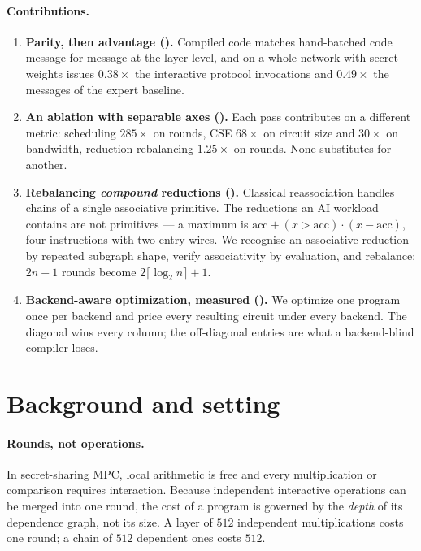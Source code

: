 \documentclass[11pt]{article}
\begin{document}
\paragraph{Contributions.}
\begin{enumerate}
\item \textbf{Parity, then advantage ().} Compiled code
matches hand-batched code message for message at the layer level, and on a
whole network with secret weights issues $0.38\times$ the interactive protocol
invocations and $0.49\times$ the messages of the expert baseline.

\item \textbf{An ablation with separable axes ().} Each
pass contributes on a different metric: scheduling $285\times$ on rounds, CSE
$68\times$ on circuit size and $30\times$ on bandwidth, reduction rebalancing
$1.25\times$ on rounds. None substitutes for another.

\item \textbf{Rebalancing \emph{compound} reductions ().}
Classical reassociation handles chains of a single associative primitive. The
reductions an AI workload contains are not primitives --- a maximum is
$\mathrm{acc} + (x>\mathrm{acc})\cdot(x-\mathrm{acc})$, four instructions with
two entry wires. We recognise an associative reduction by repeated subgraph
shape, verify associativity by evaluation, and rebalance: $2n-1$ rounds become
$2\lceil\log_2 n\rceil+1$.

\item \textbf{Backend-aware optimization, measured
().} We optimize one program once per backend and
price every resulting circuit under every backend. The diagonal wins every
column; the off-diagonal entries are what a backend-blind compiler loses.
\end{enumerate}

\section{Background and setting}\label{sec:background}

\paragraph{Rounds, not operations.} In secret-sharing MPC, local arithmetic is
free and every multiplication or comparison requires interaction. Because
independent interactive operations can be merged into one round, the cost of a
program is governed by the \emph{depth} of its dependence graph, not its size.
A layer of $512$ independent multiplications costs one round; a chain of $512$
dependent ones costs $512$.
\end{document}
